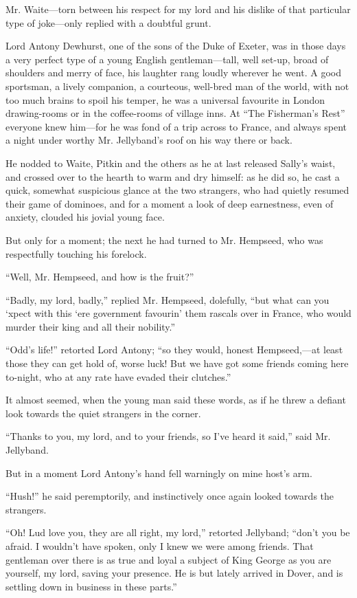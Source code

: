 \documentclass[paper=5.5in:8.5in,BCOR=7mm,twoside,DIV=calc,12pt,usegeometry,chapterprefix,endperiod,headings=big]{scrbook}
\begin{document}
Mr. Waite---torn between his respect for my lord and his dislike of that particular type of joke---only replied with a doubtful grunt.

Lord Antony Dewhurst, one of the sons of the Duke of Exeter, was in those days a very perfect type of a young English gentleman---tall, well set-up, broad of shoulders and merry of face, his laughter rang loudly wherever he went. A good sportsman, a lively companion, a courteous, well-bred man of the world, with not too much brains to spoil his temper, he was a universal favourite in London drawing-rooms or in the coffee-rooms of village inns. At \enquote{The Fisherman's Rest} everyone knew him---for he was fond of a trip across to France, and always spent a night under worthy Mr. Jellyband's roof on his way there or back.

He nodded to Waite, Pitkin and the others as he at last released Sally's waist, and crossed over to the hearth to warm and dry himself: as he did so, he cast a quick, somewhat suspicious glance at the two strangers, who had quietly resumed their game of dominoes, and for a moment a look of deep earnestness, even of anxiety, clouded his jovial young face.

But only for a moment; the next he had turned to Mr. Hempseed, who was respectfully touching his forelock.

\enquote{Well, Mr. Hempseed, and how is the fruit?}

\enquote{Badly, my lord, badly,} replied Mr. Hempseed, dolefully, \enquote{but what can you `xpect with this `ere government favourin’ them rascals over in France, who would murder their king and all their nobility.}

\enquote{Odd's life!} retorted Lord Antony; \enquote{so they would, honest Hempseed,---at least those they can get hold of, worse luck! But we have got some friends coming here to-night, who at any rate have evaded their clutches.}

It almost seemed, when the young man said these words, as if he threw a defiant look towards the quiet strangers in the corner.

\enquote{Thanks to you, my lord, and to your friends, so I've heard it said,} said Mr. Jellyband.

But in a moment Lord Antony's hand fell warningly on mine host's arm.

\enquote{Hush!} he said peremptorily, and instinctively once again looked towards the strangers.

\enquote{Oh! Lud love you, they are all right, my lord,} retorted Jellyband; \enquote{don't you be afraid. I wouldn't have spoken, only I knew we were among friends. That gentleman over there is as true and loyal a subject of King George as you are yourself, my lord, saving your presence. He is but lately arrived in Dover, and is settling down in business in these parts.}
\end{document}
